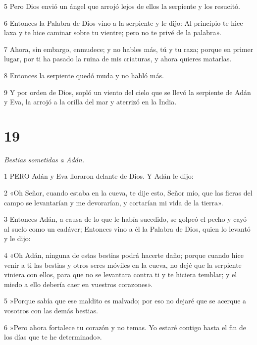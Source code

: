 \par 5 Pero Dios envió un ángel que arrojó lejos de ellos la serpiente y los resucitó.

\par 6 Entonces la Palabra de Dios vino a la serpiente y le dijo: Al principio te hice laxa y te hice caminar sobre tu vientre; pero no te privé de la palabra».

\par 7 Ahora, sin embargo, enmudece; y no hables más, tú y tu raza; porque en primer lugar, por ti ha pasado la ruina de mis criaturas, y ahora quieres matarlas.

\par 8 Entonces la serpiente quedó muda y no habló más.

\par 9 Y por orden de Dios, sopló un viento del cielo que se llevó la serpiente de Adán y Eva, la arrojó a la orilla del mar y aterrizó en la India.

\chapter{19}

\par \textit{Bestias sometidas a Adán.}

\par 1 PERO Adán y Eva lloraron delante de Dios. Y Adán le dijo:

\par 2 «Oh Señor, cuando estaba en la cueva, te dije esto, Señor mío, que las fieras del campo se levantarían y me devorarían, y cortarían mi vida de la tierra».

\par 3 Entonces Adán, a causa de lo que le había sucedido, se golpeó el pecho y cayó al suelo como un cadáver; Entonces vino a él la Palabra de Dios, quien lo levantó y le dijo:

\par 4 «Oh Adán, ninguna de estas bestias podrá hacerte daño; porque cuando hice venir a ti las bestias y otros seres móviles en la cueva, no dejé que la serpiente viniera con ellos, para que no se levantara contra ti y te hiciera temblar; y el miedo a ello debería caer en vuestros corazones».

\par 5 »Porque sabía que ese maldito es malvado; por eso no dejaré que se acerque a vosotros con las demás bestias.

\par 6 »Pero ahora fortalece tu corazón y no temas. Yo estaré contigo hasta el fin de los días que te he determinado».


